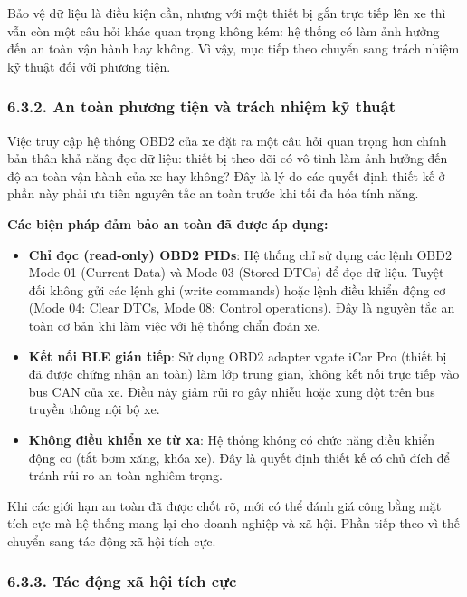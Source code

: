 \documentclass[a4paper]{extarticle}
\providecommand{\tightlist}{%
  \setlength{\itemsep}{0pt}\setlength{\parskip}{0pt}}
\begin{document}
Bảo vệ dữ liệu là điều kiện cần, nhưng với một thiết bị gắn trực tiếp
lên xe thì vẫn còn một câu hỏi khác quan trọng không kém: hệ thống có
làm ảnh hưởng đến an toàn vận hành hay không. Vì vậy, mục tiếp theo
chuyển sang trách nhiệm kỹ thuật đối với phương tiện.

\subsubsection{6.3.2. An toàn phương tiện và trách nhiệm kỹ
thuật}\label{632-an-touxe0n-phux1b0ux1a1ng-tiux1ec7n-vuxe0-truxe1ch-nhiux1ec7m-kux1ef9-thuux1eadt}

Việc truy cập hệ thống OBD2 của xe đặt ra một câu hỏi quan trọng hơn
chính bản thân khả năng đọc dữ liệu: thiết bị theo dõi có vô tình làm
ảnh hưởng đến độ an toàn vận hành của xe hay không? Đây là lý do các
quyết định thiết kế ở phần này phải ưu tiên nguyên tắc an toàn trước khi
tối đa hóa tính năng.

\textbf{Các biện pháp đảm bảo an toàn đã được áp dụng:}

\begin{itemize}
\tightlist
\item
  \textbf{Chỉ đọc (read-only) OBD2 PIDs}: Hệ thống chỉ sử dụng các lệnh
  OBD2 Mode 01 (Current Data) và Mode 03 (Stored DTCs) để đọc dữ liệu.
  Tuyệt đối không gửi các lệnh ghi (write commands) hoặc lệnh điều khiển
  động cơ (Mode 04: Clear DTCs, Mode 08: Control operations). Đây là
  nguyên tắc an toàn cơ bản khi làm việc với hệ thống chẩn đoán xe.
\item
  \textbf{Kết nối BLE gián tiếp}: Sử dụng OBD2 adapter vgate iCar Pro
  (thiết bị đã được chứng nhận an toàn) làm lớp trung gian, không kết
  nối trực tiếp vào bus CAN của xe. Điều này giảm rủi ro gây nhiễu hoặc
  xung đột trên bus truyền thông nội bộ xe.
\item
  \textbf{Không điều khiển xe từ xa}: Hệ thống không có chức năng điều
  khiển động cơ (tắt bơm xăng, khóa xe). Đây là quyết định thiết kế có
  chủ đích để tránh rủi ro an toàn nghiêm trọng.
\end{itemize}

Khi các giới hạn an toàn đã được chốt rõ, mới có thể đánh giá công bằng
mặt tích cực mà hệ thống mang lại cho doanh nghiệp và xã hội. Phần tiếp
theo vì thế chuyển sang tác động xã hội tích cực.

\subsubsection{6.3.3. Tác động xã hội tích
cực}\label{633-tuxe1c-ux111ux1ed9ng-xuxe3-hux1ed9i-tuxedch-cux1ef1c}
\end{document}
